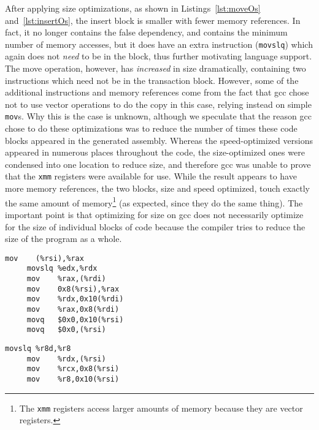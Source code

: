 After applying size optimizations, as shown in Listings~\ref{lst:moveOs}
and~\ref{lst:insertOs}, the insert block is smaller with fewer memory
references. In fact, it no longer contains the false dependency, and contains
the minimum number of memory accesses, but it does have
an extra instruction (\texttt{movslq}) which again does not \textit{need} to be in the block, thus
further motivating language support. The move operation, however, has
\textit{increased} in size dramatically, containing two instructions which need
not be in the transaction block. However, some of the additional instructions
and memory references come from the fact that gcc chose not to use vector
operations to do the copy in this case, relying instead on simple \texttt{mov}s.
Why this is the case is unknown, although we speculate that the reason gcc
chose to do these optimizations was to reduce the number of times these code
blocks appeared in the generated assembly. Whereas the speed-optimized versions
appeared in numerous places throughout the code, the size-optimized ones were
condensed into one location to reduce size, and therefore gcc was unable to
prove that the \texttt{xmm} registers were available for use. While the result
appears to have more memory references, the two blocks, size and speed optimized,
touch exactly the same amount of memory\footnote{The \texttt{xmm} registers
access larger amounts of memory because they are vector registers.}
(as expected, since they do the same thing).
The important point is that optimizing for size on gcc does not necessarily
optimize for the size of individual blocks of code because the compiler tries to
reduce the size of the program as a whole.




\begin{lstlisting}[caption={Transaction code generation for do\_move, optimized for size.
Eight instructions, seven memory accesses (five writes).},label=lst:moveOs]
     mov    (%rsi),%rax
     movslq %edx,%rdx
     mov    %rax,(%rdi)
     mov    0x8(%rsi),%rax
     mov    %rdx,0x10(%rdi)
     mov    %rax,0x8(%rdi)
     movq   $0x0,0x10(%rsi)
     movq   $0x0,(%rsi)
\end{lstlisting}

\begin{lstlisting}[caption={Transaction code generation for do\_insert, optimized for size.
Four instructions, three memory accesses (three writes).},label=lst:insertOs]
     movslq %r8d,%r8
     mov    %rdx,(%rsi)
     mov    %rcx,0x8(%rsi)
     mov    %r8,0x10(%rsi)
\end{lstlisting}



